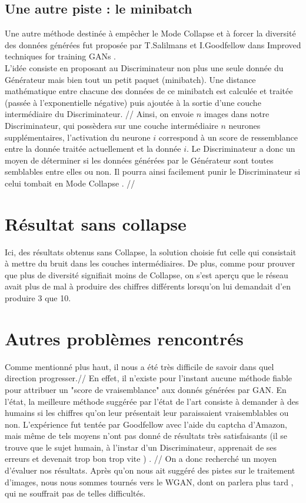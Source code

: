 	

	\subsection{Une autre piste : le minibatch}
		Une autre méthode destinée à empêcher le Mode Collapse et à forcer la diversité des données générées fut proposée par T.Salilmans et I.Goodfellow dans Improved techniques for training GANs \cite{salimans_improved_2016}.\\
		L'idée consiste en proposant au Discriminateur non plus une seule donnée du Générateur mais bien tout un petit paquet (minibatch). Une distance mathématique entre chacune des données de ce minibatch est calculée et traitée (passée à l'exponentielle négative) puis ajoutée à la sortie d'une couche intermédiaire du Discriminateur. //
		Ainsi, on envoie $n$ images dans notre Discriminateur, qui possèdera sur une couche intermédiaire $n$ neurones supplémentaires, l'activation du neurone $i$ correspond à un score de ressemblance entre la donnée traitée actuellement et la donnée $i$. Le Discriminateur a donc un moyen de déterminer si les données générées par le Générateur sont toutes semblables entre elles ou non. Il pourra ainsi facilement punir le Discriminateur si celui tombait en Mode Collapse . //
		
	



\section{Résultat sans collapse}
Ici, des résultats obtenus sans Collapse, la solution choisie fut celle qui consistait à mettre du bruit dans les couches intermédiaires. De plus, comme pour prouver que plus de diversité signifiait moins de Collapse, on s'est aperçu que le réseau avait plus de mal à produire des chiffres différents lorsqu'on lui demandait d'en produire 3 que 10.


\section{Autres problèmes rencontrés } 
Comme mentionné plus haut, il nous a été très difficile de savoir dans quel direction progresser.//
En effet, il n'existe pour l'instant aucune méthode fiable pour attribuer un "score de vraisemblance"  aux donnés générées par GAN. En l'état, la meilleure méthode suggérée par l'état de l'art consiste à demander à des humains si les chiffres qu'on leur présentait leur paraissaient vraisemblables ou non. L'expérience fut tentée par Goodfellow avec l'aide du captcha d'Amazon, mais même de tels moyens n'ont pas donné de résultats très satisfaisants (il se trouve que le sujet humain, à l'instar d'un Discriminateur, apprenait de ses erreurs et devenait trop bon trop vite ) . //
On a donc recherché un moyen d'évaluer nos résultats. Après qu'on nous ait suggéré des pistes sur le traitement d'images, nous nous sommes tournés vers le WGAN, dont on parlera plus tard , qui ne souffrait pas de telles difficultés. 

